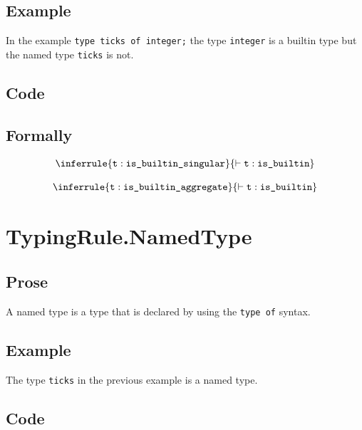 \documentclass{book}
\newcommand\isbuiltinsingular[0]{\texttt{is\_builtin\_singular}}
\newcommand\isbuiltinaggregate[0]{\texttt{is\_builtin\_aggregate}}
\newcommand\isbuiltin[0]{\texttt{is\_builtin}}
\newcommand\vt[0]{\texttt{t}}
\begin{document}
    \subsection{Example}
In the example \texttt{type ticks of integer;} the type \texttt{integer} is a builtin type but the named type \texttt{ticks} is not.

    \subsection{Code}

\begin{formal}
      \subsection{Formally}
\[
\begin{array}{c}
\inferrule{\vt : \isbuiltinsingular}{\entails \vt : \isbuiltin}\\
\\
\inferrule{\vt : \isbuiltinaggregate}{\entails \vt : \isbuiltin}\\
\end{array}
\]
\end{formal}

	   
\section{TypingRule.NamedType \label{sec:TypingRule.NamedType} } 

    \subsection{Prose}
    A named type is a type that is declared by using the \texttt{type of} syntax.

    \subsection{Example}
    The type \texttt{ticks} in the previous example is a named type.

    \subsection{Code}
\end{document}
